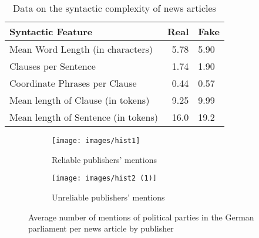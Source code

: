 \documentclass[11pt]{article}
\begin{document}
\begin{table*}
\centering
\caption{Data on the syntactic complexity of news articles}
\begin{tabular}{|f|r|f|}
\hline
\textbf{Syntactic Feature}&\textbf{Real}&\textbf{Fake}\\
\hline
Mean Word Length (in characters) & 5.78 & 5.90\\
Clauses per Sentence & 1.74 & 1.90 \\
Coordinate Phrases per Clause & 0.44 & 0.57\\
Mean length of Clause (in tokens) & 9.25 & 9.99\\
Mean length of Sentence (in tokens) & 16.0 & 19.2\\

\hline

\end{tabular}

\label{tab:syntactic}
\end{table*}

\begin{figure*}[t]
\centering
\begin{subfigure}{.5\textwidth}
  \centering
  \texttt{[image: images/hist1]}
  \caption{Reliable publishers' mentions}
  \label{fig:sub1}
\end{subfigure}%
\begin{subfigure}{.5\textwidth}
  \centering
  \texttt{[image: images/hist2 (1)]}
  \caption{Unreliable publishers' mentions}
  \label{fig:sub2}
\end{subfigure}
\caption{Average number of mentions of political parties in the German parliament per news article by publisher}
\label{fig:politicalpartycount}
\end{figure*}
\end{document}

